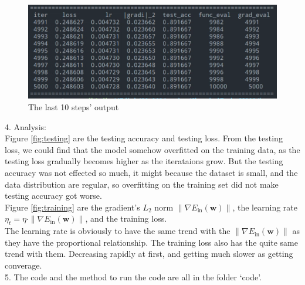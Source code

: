 \begin{figure}[htbp]
  \centerline{\includegraphics[width=\textwidth]{../image/info.png}}
  \caption{The last 10 steps' output} 
  \label{fig:info} 
\end{figure}

4. Analysis:\\
Figure \ref{fig:testing} are the testing accuracy and testing loss. From the 
testing loss, we could find that the model somehow overfitted on the training data, as the 
testing loss gradually becomes higher as the iterataions grow. But the testing accuracy was not effected so much,
it might because the dataset is small, and the data distribution are regular, so overfitting on the training set did not make testing accuracy got worse.\\

Figure \ref{fig:training} are the gradient's $L_2$ norm $\|\nabla E_{\text{in}}(\mathbf{w})\|$, the learning rate $\eta_t = \eta\cdot \|\nabla E_{\text{in}}(\mathbf{w})\|$, and the training loss.\\
The learning rate is obviously to have the same trend with the $\|\nabla E_{\text{in}}(\mathbf{w})\|$ as they have the proportional relationship. The training loss also has the 
quite same trend with them. Decreasing rapidly at first, and getting much slower as getting converage.\\

5. The code and the method to run the code are all in the folder `code'.

